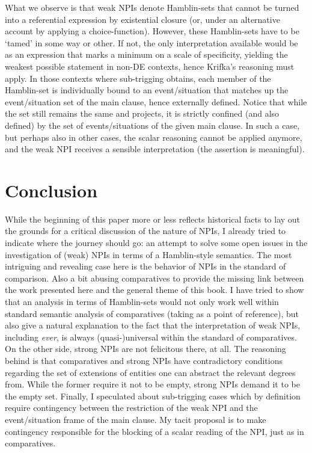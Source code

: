 \documentclass[output=paper,colorlinks,citecolor=brown,
]{langscibook}
\begin{document}
What we observe is that weak NPIs denote Hamblin-sets that cannot be turned into a
referential expression by existential closure (or, under an alternative account by applying a choice-function).
However, these Hamblin-sets have to be `tamed' in some way or other. If not, the only interpretation available would be
as an expression that marks a minimum on a scale of specificity, yielding the weakest possible statement in non-DE
contexts, hence Krifka's reasoning must apply. In those contexts where sub-trigging obtains, each member of the
Hamblin-set is individually bound to an event/situation that matches up the event/situation set of the main clause,
hence externally defined. Notice that while the set still remains the same and projects, it is strictly confined (and
also defined) by the set of events/situations of the given main clause. In such a case, but perhaps also in other
cases, the scalar reasoning cannot be applied anymore, and the weak NPI receives a sensible interpretation (the
assertion is meaningful).

\section{Conclusion}

While the beginning of this paper more or less reflects historical facts to lay out the grounds for a critical discussion of the nature of NPIs,
I already tried to indicate where the journey should go: an attempt to solve some open issues in the investigation of
(weak) NPIs in terms of a Hamblin-style semantics. The most intriguing and revealing case here is the behavior of NPIs
in the standard of comparison. Also a bit abusing comparatives to provide the missing link between the work presented
here and the general theme of this book. I have tried to show that an analysis in terms of Hamblin-sets would not only work
well within standard semantic analysis of comparatives (taking \citet{stechow1984} as a point of reference), but
also give a natural explanation to the fact that the interpretation of weak NPIs, including \textit{ever}, is always
(quasi-)universal within the standard of comparatives. On the other side, strong NPIs are not felicitous there, at all.
The reasoning behind is that comparatives and strong NPIs have contradictory conditions regarding the set
of extensions of entities one can abstract the relevant degrees from. While the former require it not to be empty,
strong NPIs demand it to be the empty set. Finally, I speculated about sub-trigging cases which by definition require
contingency between the restriction of the weak NPI and the event/situation frame of the main clause. My tacit proposal
is to make contingency responsible for the blocking of a scalar reading of the NPI, just as in comparatives.
\end{document}
